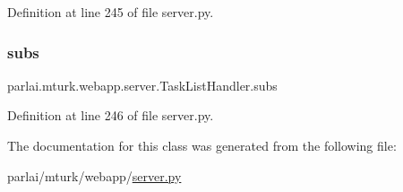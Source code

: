 Definition at line 245 of file server.\+py.

\mbox{\label{classparlai_1_1mturk_1_1webapp_1_1server_1_1TaskListHandler_a9cbeab910d93da1b08334339c3a93bdf}} 
\subsubsection{\texorpdfstring{subs}{subs}}
{\footnotesize\ttfamily parlai.\+mturk.\+webapp.\+server.\+Task\+List\+Handler.\+subs}



Definition at line 246 of file server.\+py.



The documentation for this class was generated from the following file\+:\begin{DoxyCompactItemize}
\item 
parlai/mturk/webapp/\hyperlink{server_8py}{server.\+py}\end{DoxyCompactItemize}
